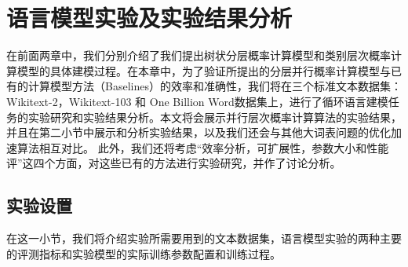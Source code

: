 
\chapter{语言模型实验及实验结果分析}
在前面两章中，我们分别介绍了我们提出树状分层概率计算模型和类别层次概率计算模型的具体建模过程。在本章中，为了验证所提出的分层并行概率计算模型与已有的计算模型方法（Baselines）的效率和准确性，我们将在三个标准文本数据集：Wikitext-2，Wikitext-103 和 One Billion Word数据集上，进行了循环语言建模任务的实验研究和实验结果分析。本文将会展示并行层次概率计算算法的实验结果，并且在第二小节中展示和分析实验结果，以及我们还会与其他大词表问题的优化加速算法相互对比。 此外，我们还将考虑``效率分析，可扩展性，参数大小和性能评''这四个方面，对这些已有的方法进行实验研究，并作了讨论分析。

\section{实验设置}
在这一小节，我们将介绍实验所需要用到的文本数据集，语言模型实验的两种主要的评测指标和实验模型的实际训练参数配置和训练过程。
